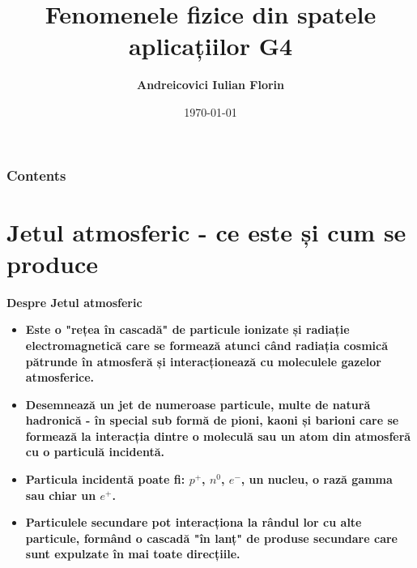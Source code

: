 \documentclass[10pt]{beamer}
\title[Explicații]{\textbf{Fenomenele fizice din spatele aplicațiilor G4}}
\author[Andreicovici Iulian Florin]{\textbf{Andreicovici Iulian Florin}}
\institute[UPB]{\textit{Universitatea Politehnica din București - UPB}}
\date[\textcolor{white}{\today} ]
{\today}
\begin{document}
\frame{\titlepage}
\begin{frame}
\frametitle{Contents}
\tableofcontents
\end{frame}

\section{\textbf{ Jetul atmosferic - ce este și cum se produce}}
  
  
  \begin{frame}{\textbf{Despre Jetul atmosferic}}
 \vspace{-1cm}

  \begin{itemize}
    
      \item[\ding{51}] \makebox[0.5cm]{} \textbf{ Este o "rețea în cascadă" de particule ionizate și radiație electromagnetică care se formează atunci când radiația cosmică pătrunde în atmosferă și interacționează cu moleculele gazelor atmosferice.} \\
      
      \item[\ding{51}] \makebox[0.5cm]{} \textbf{ Desemnează un jet de numeroase particule, multe de natură hadronică - în special sub formă de pioni, kaoni și barioni care se formează la interacția dintre o moleculă sau un atom din atmosferă cu o particulă incidentă.}\\
     
     \item[\ding{51}] \makebox[0.5cm]{} \textbf{ Particula incidentă poate fi: $p^+$, $n^0$, $e^-$, un nucleu, o rază gamma sau chiar un $e^+$.}

     \item[\ding{51}] \makebox[0.5cm]{} \textbf{ Particulele secundare pot interacționa la rândul lor cu alte particule, formând o cascadă "în lanț" de produse secundare care sunt expulzate în mai toate direcțiile.}
   
  \end{itemize}
 
    \end{frame}
\end{document}
